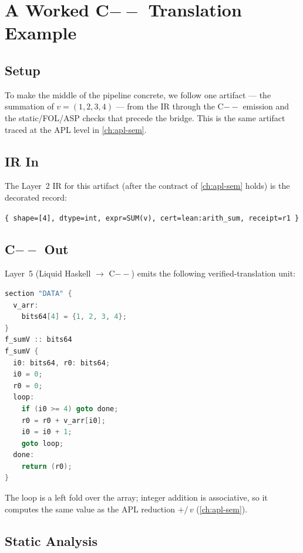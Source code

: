 \chapter{A Worked C$--$ Translation Example}
\label{ch:workcmm}

\section{Setup}
\label{sec:work-setup}

To make the middle of the pipeline concrete, we follow one artifact ---
the summation of $v = (1,2,3,4)$ --- from the IR through the C$--$
emission and the static/FOL/ASP checks that precede the bridge. This is
the same artifact traced at the APL level in \cref{ch:apl-sem}.

\section{IR In}
\label{sec:work-ir}

The Layer~2 IR for this artifact (after the contract of
\cref{ch:apl-sem} holds) is the decorated record:
\begin{center}
\texttt{\{ shape=[4], dtype=int, expr=SUM(v), cert=lean:arith\_sum,
  receipt=r1 \}}
\end{center}

\section{C$--$ Out}
\label{sec:work-out}

Layer~5 (Liquid Haskell $\to$ C$--$) emits the following
verified-translation unit:
\begin{lstlisting}[language=C,caption={C$--$ emitted for $\Sigma\,\omega$
  on $v=(1,2,3,4)$.},label=lst:work-cmm]
section "DATA" {
  v_arr:
    bits64[4] = {1, 2, 3, 4};
}
f_sumV :: bits64
f_sumV {
  i0: bits64, r0: bits64;
  i0 = 0;
  r0 = 0;
  loop:
    if (i0 >= 4) goto done;
    r0 = r0 + v_arr[i0];
    i0 = i0 + 1;
    goto loop;
  done:
    return (r0);
}
\end{lstlisting}
The loop is a left fold over the array; integer addition is associative,
so it computes the same value as the APL reduction $+/\,v$
(\cref{ch:apl-sem}).

\section{Static Analysis}
\label{sec:work-static}

